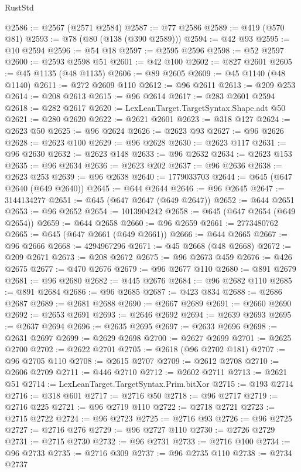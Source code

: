 \begin{lexlean}{RustStd}
\begin{coremodule}
@2586 := @2567 (@2571 @2584)
@2587 := @77 @2586
@2589 := @419 (@570 @81)
@2593 := @78 (@80 (@138 (@390 @2589)))
@2594 := @42 @93
@2595 := @10 @2594
@2596 := @54 @18
@2597 := @2595 @2596
@2598 := @52 @2597
@2600 := @2593 @2598 @51
@2601 := @42 @100
@2602 := @827 @2601
@2605 := @45 @1135 (@48 @1135)
@2606 := @89 @2605
@2609 := @45 @1140 (@48 @1140)
@2611 := @272 @2609 @110
@2612 := @96 @2611
@2613 := @209 @253
@2614 := @208 @2613
@2615 := @96 @2614
@2617 := @283 @2601 @2594
@2618 := @282 @2617
@2620 := LexLeanTarget.TargetSyntax.Shape.adt @50
@2621 := @280 @2620
@2622 := @2621 @2601
@2623 := @318 @127
@2624 := @2623 @50
@2625 := @96 @2624
@2626 := @2623 @93
@2627 := @96 @2626
@2628 := @2623 @100
@2629 := @96 @2628
@2630 := @2623 @117
@2631 := @96 @2630
@2632 := @2623 @148
@2633 := @96 @2632
@2634 := @2623 @153
@2635 := @96 @2634
@2636 := @2623 @202
@2637 := @96 @2636
@2638 := @2623 @253
@2639 := @96 @2638
@2640 := 1779033703
@2644 := @645 (@647 @2640 (@649 @2640))
@2645 := @644 @2644
@2646 := @96 @2645
@2647 := 3144134277
@2651 := @645 (@647 @2647 (@649 @2647))
@2652 := @644 @2651
@2653 := @96 @2652
@2654 := 1013904242
@2658 := @645 (@647 @2654 (@649 @2654))
@2659 := @644 @2658
@2660 := @96 @2659
@2661 := 2773480762
@2665 := @645 (@647 @2661 (@649 @2661))
@2666 := @644 @2665
@2667 := @96 @2666
@2668 := 4294967296
@2671 := @45 @2668 (@48 @2668)
@2672 := @209 @2671
@2673 := @208 @2672
@2675 := @96 @2673 @459
@2676 := @426 @2675
@2677 := @470 @2676
@2679 := @96 @2677 @110
@2680 := @891 @2679
@2681 := @96 @2680
@2682 := @445 @2676
@2684 := @96 @2682 @110
@2685 := @891 @2684
@2686 := @96 @2685
@2687 := @423 @834
@2688 := @2686 @2687
@2689 := @2681 @2688
@2690 := @2667 @2689
@2691 := @2660 @2690
@2692 := @2653 @2691
@2693 := @2646 @2692
@2694 := @2639 @2693
@2695 := @2637 @2694
@2696 := @2635 @2695
@2697 := @2633 @2696
@2698 := @2631 @2697
@2699 := @2629 @2698
@2700 := @2627 @2699
@2701 := @2625 @2700
@2702 := @2622 @2701
@2705 := @2618 (@96 @2702 @181)
@2707 := @96 @2705 @110
@2708 := @2615 @2707
@2709 := @2612 @2708
@2710 := @2606 @2709
@2711 := @446 @2710
@2712 := @2602 @2711
@2713 := @2621 @51
@2714 := LexLeanTarget.TargetSyntax.Prim.bitXor
@2715 := @193 @2714
@2716 := @318 @601
@2717 := @2716 @50
@2718 := @96 @2717
@2719 := @2716 @225
@2721 := @96 @2719 @110
@2722 := @2718 @2721
@2723 := @2715 @2722
@2724 := @96 @2723
@2725 := @2716 @93
@2726 := @96 @2725
@2727 := @2716 @276
@2729 := @96 @2727 @110
@2730 := @2726 @2729
@2731 := @2715 @2730
@2732 := @96 @2731
@2733 := @2716 @100
@2734 := @96 @2733
@2735 := @2716 @309
@2737 := @96 @2735 @110
@2738 := @2734 @2737

\end{coremodule}
\end{lexlean}
